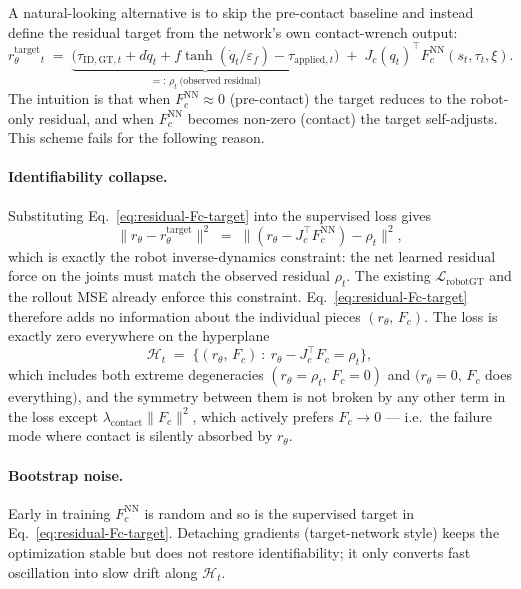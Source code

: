 \documentclass[11pt]{article}
\begin{document}
A natural-looking alternative is to skip the pre-contact baseline and
instead define the residual target from the network's own contact-wrench
output:
\begin{equation}
  r_\theta^{\mathrm{target}}_t
  \;=\;
  \underbrace{\bigl(\tau_{\mathrm{ID,GT},t} + d\dot q_t + f\tanh(\dot q_t/\varepsilon_f) - \tau_{\mathrm{applied},t}\bigr)}_{=:\,\rho_t\ \text{(observed residual)}}
  \;+\; J_c(q_t)^\top F_c^{\mathrm{NN}}(s_t,\tau_t,\xi).
  \label{eq:residual-Fc-target}
\end{equation}
The intuition is that when $F_c^{\mathrm{NN}}\!\approx 0$ (pre-contact) the
target reduces to the robot-only residual, and when $F_c^{\mathrm{NN}}$
becomes non-zero (contact) the target self-adjusts. This scheme fails for
the following reason.

\paragraph{Identifiability collapse.}
Substituting Eq.~\eqref{eq:residual-Fc-target} into the supervised loss
gives
\begin{equation}
  \bigl\|r_\theta - r_\theta^{\mathrm{target}}\bigr\|^2
  \;=\;
  \bigl\|(r_\theta - J_c^\top F_c^{\mathrm{NN}}) - \rho_t\bigr\|^2,
  \label{eq:residual-Fc-collapse}
\end{equation}
which is exactly the robot inverse-dynamics constraint: the net learned
residual force on the joints must match the observed residual
$\rho_t$. The existing $\mathcal{L}_{\mathrm{robotGT}}$ and the rollout
MSE already enforce this constraint. Eq.~\eqref{eq:residual-Fc-target}
therefore adds no information about the individual pieces
$(r_\theta,\,F_c)$. The loss is exactly zero everywhere on the hyperplane
\begin{equation}
  \mathcal{H}_t \;=\;
  \bigl\{(r_\theta,\,F_c)\ :\ r_\theta - J_c^\top F_c = \rho_t\bigr\},
\end{equation}
which includes both extreme degeneracies
$(r_\theta=\rho_t,\,F_c=0)$ and
$(r_\theta=0,\,F_c$ does everything$)$, and the symmetry between them is
not broken by any other term in the loss except $\lambda_{\mathrm{contact}}\|F_c\|^2$,
which actively prefers $F_c\!\to\!0$ — i.e.\ the failure mode where
contact is silently absorbed by $r_\theta$.

\paragraph{Bootstrap noise.}
Early in training $F_c^{\mathrm{NN}}$ is random and so is the supervised
target in Eq.~\eqref{eq:residual-Fc-target}. Detaching gradients
(target-network style) keeps the optimization stable but does not
restore identifiability; it only converts fast oscillation into slow
drift along $\mathcal{H}_t$.
\end{document}
